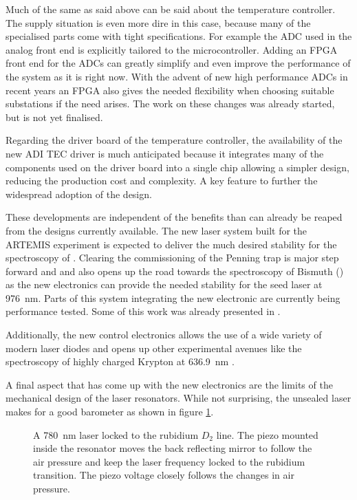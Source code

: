 Much of the same as said above can be said about the temperature controller. The supply situation is even more dire in this case, because many of the specialised parts come with tight specifications. For example the  ADC used in the analog front end is explicitly tailored to the microcontroller. Adding an FPGA front end for the ADCs can greatly simplify and even improve the performance of the system as it is right now. With the advent of new high performance ADCs in recent years an FPGA also gives the needed flexibility when choosing suitable substations if the need arises. The work on these changes was already started, but is not yet finalised.

Regarding the driver board of the temperature controller, the availability of the new ADI  TEC driver is much anticipated because it integrates many of the components used on the driver board into a single chip allowing a simpler design, reducing the production cost and complexity. A key feature to further the widespread adoption of the design.

These developments are independent of the benefits than can already be reaped from the designs currently available. The new laser system built for the ARTEMIS experiment is expected to deliver the much desired stability for the spectroscopy of . Clearing the commissioning of the Penning trap is major step forward and and also opens up the road towards the spectroscopy of Bismuth () as the new electronics can provide the needed stability for the seed laser at \qty{976}{\nm}. Parts of this system integrating the new electronic are currently being performance tested. Some of this work was already presented in \cite{thesis_tilman}.

Additionally, the new control electronics allows the use of a wide variety of modern laser diodes and opens up other experimental avenues like the spectroscopy of highly charged Krypton  at \qty{636.9}{\nm} \cite{krypton17+,krypton17+_2}.

A final aspect that has come up with the new electronics are the limits of the mechanical design of the laser resonators. While not surprising, the unsealed laser makes for a good barometer as shown in figure \ref{fig:atomics_master_barometer}.
\begin{figure}[ht]
    \centering
    
    \caption{A \qty{780}{\nm} laser locked to the rubidium  $D_2$ line. The piezo mounted inside the resonator moves the back reflecting mirror to follow the air pressure and keep the laser frequency locked to the rubidium transition. The piezo voltage closely follows the changes in air pressure.}
    \label{fig:atomics_master_barometer}
\end{figure}

